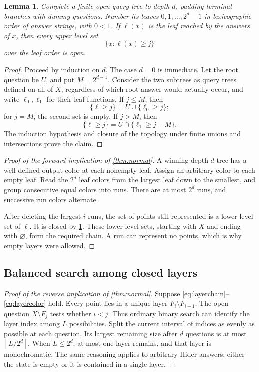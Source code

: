 \documentclass[11pt,letterpaper]{article}
\numberwithin{equation}{section}
\newtheorem{lemma}[lemma]{Lemma}
\theoremstyle{definition}
\theoremstyle{remark}
\newcommand{\ceil}[1]{\left\lceil#1\right\rceil}
\begin{document}
\begin{lemma}\label{lem:leaf}
Complete a finite open-query tree to depth $d$, padding terminal branches with
dummy questions. Number its leaves $0,1,\ldots,2^d-1$ in lexicographic order of
answer strings, with $0<1$. If $\ell(x)$ is the leaf reached by the answers of
$x$, then every upper level set
\[
 \{x:\ell(x)\geq j\}
\]
over the leaf order is open.
\end{lemma}
\begin{proof}
Proceed by induction on $d$. The case $d=0$ is immediate. Let the root question
be $U$, and put $M=2^{d-1}$. Consider the two subtrees as query trees defined on
all of $X$, regardless of which root answer would actually occur, and write
$\ell_0,\ell_1$ for their leaf functions. If $j\leq M$, then
\[
 \{\ell\geq j\}=U\cup\{\ell_0\geq j\};
\]
for $j=M$, the second set is empty. If $j>M$, then
\[
 \{\ell\geq j\}=U\cap\{\ell_1\geq j-M\}.
\]
The induction hypothesis and closure of the topology under finite unions and
intersections prove the claim.
\end{proof}

\begin{proof}[Proof of the forward implication of \cref{thm:normal}]
A winning depth-$d$ tree has a well-defined output color at each nonempty leaf.
Assign an arbitrary color to each empty leaf. Read the $2^d$ leaf colors from
the largest leaf down to the smallest, and group consecutive equal colors into
runs. There are at most $2^d$ runs, and successive run colors alternate.

After deleting the largest $i$ runs, the set of points still represented is a
lower level set of $\ell$. It is closed by \cref{lem:leaf}. These lower level
sets, starting with $X$ and ending with $\varnothing$, form the required chain.
A run can represent no points, which is why empty layers were allowed.
\end{proof}

\subsection{Balanced search among closed layers}

\begin{proof}[Proof of the reverse implication of \cref{thm:normal}]
Suppose \eqref{eq:layerchain}--\eqref{eq:layercolor} hold. Every point lies in a
unique layer $F_i\setminus F_{i+1}$. The open question $X\setminus F_j$ tests
whether $i<j$. Thus ordinary binary search can identify the layer index among
$L$ possibilities. Split the current interval of indices as evenly as possible
at each question. Its largest remaining size after $d$ questions is at most
$\ceil{L/2^d}$. When $L\leq2^d$, at most one layer remains, and that layer is
monochromatic. The same reasoning applies to arbitrary Hider answers: either
the state is empty or it is contained in a single layer.
\end{proof}
\end{document}
